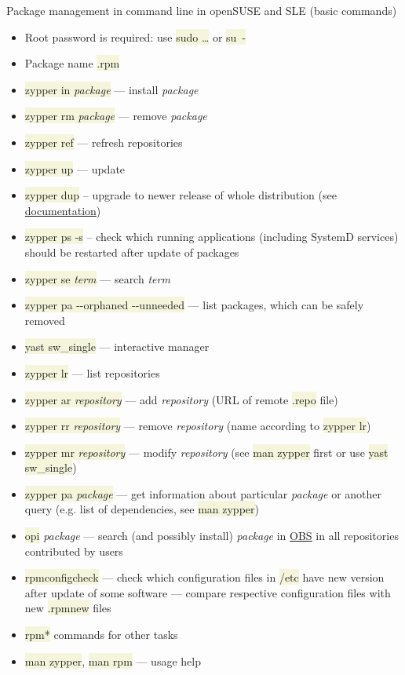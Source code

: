 \documentclass[compress, xelatex, 11pt, xcolor=svgnames, aspectratio=169,
	hyperref={
		bookmarks=true,
		unicode=true,
		colorlinks=true,
		pdftitle={Linux, command line and MetaCentrum},
		plainpages=false,
		pdfauthor={Vojtech Zeisek},
		pdfsubject={Course about use of Linux command line, writing shell scripts and using MetaCentrum of CESNET},
		pdfcreator={XeLaTeX},
		pdfkeywords={Linux, GNU, BASH, shell, command line, MetaCentrum},
		linkcolor=DarkRed, %
		anchorcolor=DarkBlue, %
		citecolor=Indigo, %
		filecolor=NavyBlue, %
		menucolor=DarkMagenta, %
		urlcolor=DarkBlue, %
		},
	url={hyphens, lowtilde} %
	]{beamer}
\renewcommand{\texttt}[1]{\colorbox{Beige}{{\ttfamily #1}}}
\begin{document}
\begin{frame}[allowframebreaks]{Package management in command line in openSUSE and SLE (basic commands)}
	\begin{itemize}
		\item Root password is required: use \texttt{sudo \ldots} or \texttt{su~-}
		\item Package name \texttt{*.rpm}
		\item \texttt{zypper in \textit{package}} --- install \textit{package}
		\item \texttt{zypper rm \textit{package}} --- remove \textit{package}
		\item \texttt{zypper ref} --- refresh repositories
		\item \texttt{zypper up} --- update
		\item \texttt{zypper dup} -- upgrade to newer release of whole distribution (see \href{https://en.opensuse.org/SDB:System_upgrade}{documentation})
		\item \texttt{zypper ps -s} -- check which running applications (including SystemD services) should be restarted after update of packages
		\item \texttt{zypper se \textit{term}} --- search \textit{term}
		\item \texttt{zypper pa -{-}orphaned -{-}unneeded} --- list packages, which can be safely removed
		\item \texttt{yast sw\_single} --- interactive manager
		\item \texttt{zypper lr} --- list repositories
		\item \texttt{zypper ar \textit{repository}} --- add \textit{repository} (URL of remote \texttt{*.repo} file)
		\item \texttt{zypper rr \textit{repository}} --- remove \textit{repository} (name according to \texttt{zypper lr})
		\item \texttt{zypper mr \textit{repository}} --- modify \textit{repository} (see \texttt{man zypper} first or use \texttt{yast sw\_single})
		\item \texttt{zypper pa \textit{package}} --- get information about particular \textit{package} or another query (e.g. list of dependencies, see \texttt{man zypper})
		\item \texttt{opi} \textit{package} --- search (and possibly install) \textit{package} in \href{https://build.opensuse.org/}{OBS} in all repositories contributed by users
		\item \texttt{rpmconfigcheck} --- check which configuration files in \texttt{/etc} have new version after update of some software --- compare respective configuration files with new \texttt{*.rpmnew} files
		\item \texttt{rpm*} commands for other tasks
		\item \texttt{man zypper}, \texttt{man rpm} --- usage help
	\end{itemize}
\end{frame}
\end{document}
